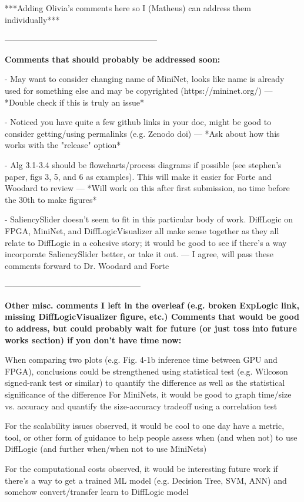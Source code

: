 ***Adding Olivia's comments here so I (Matheus) can address them individually***

--------------------------------------------------------

\textbf{Comments that should probably be addressed soon:
}

- May want to consider changing name of MiniNet, looks like name is already used for something else and may be copyrighted (https://mininet.org/)
--- *Double check if this is truly an issue*

- Noticed you have quite a few github links in your doc, might be good to consider getting/using permalinks (e.g. Zenodo doi)
--- *Ask about how this works with the "release" option*

- Alg 3.1-3.4 should be flowcharts/process diagrams if possible (see stephen’s paper, figs 3, 5, and 6 as examples). This will make it easier for Forte and Woodard to review
--- *Will work on this after first submission, no time before the 30th to make figures* 

- SaliencySlider doesn’t seem to fit in this particular body of work. DiffLogic on FPGA, MiniNet, and DiffLogicVisualizer all make sense together as they all relate to DiffLogic in a cohesive story; it would be good to see if there’s a way incorporate SaliencySlider better, or take it out.
--- I agree, will pass these comments forward to Dr. Woodard and Forte

--------------------------------------------------

\textbf{Other misc. comments I left in the overleaf (e.g. broken ExpLogic link, missing DiffLogicVisualizer figure, etc.) Comments that would be good to address, but could probably wait for future (or just toss into future works section) if you don’t have time now:}

When comparing two plots (e.g. Fig. 4-1b inference time between GPU and FPGA), conclusions could be strengthened using statistical test (e.g. Wilcoson signed-rank test or similar) to quantify the difference as well as the statistical significance of the difference
For MiniNets, it would be good to graph time/size vs. accuracy and quantify the size-accuracy tradeoff using a correlation test

For the scalability issues observed, it would be cool to one day have a metric, tool, or other form of guidance to help people assess when (and when not) to use DiffLogic (and further when/when not to use MiniNets)

For the computational costs observed, it would be interesting future work if there’s a way to get a trained ML model (e.g. Decision Tree, SVM, ANN) and somehow convert/transfer learn to DiffLogic model

